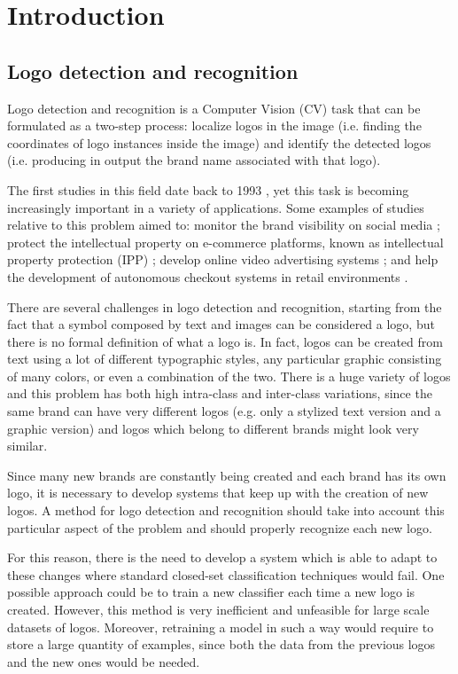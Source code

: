 \chapter{Introduction}
\label{chap:introduction}

\section{Logo detection and recognition}
\label{sec:logodet-intro}

Logo detection and recognition is a Computer Vision (CV) task that can be formulated as a two-step process: localize logos in the image (i.e. finding the coordinates of logo instances inside the image) and identify the detected logos (i.e. producing in output the brand name associated with that logo).

The first studies in this field date back to 1993 \cite{doermann1993logo}, yet this task is becoming increasingly important in a variety of applications. Some examples of studies relative to this problem aimed to: monitor the brand visibility on social media \cite{7492197}; protect the intellectual property on e-commerce platforms, known as intellectual property protection (IPP) \cite{jin2020open}; develop online video advertising systems \cite{cheng2017video}; and help the development of autonomous checkout systems in retail environments \cite{mata2022standardsim}.

There are several challenges in logo detection and recognition, starting from the fact that a symbol composed by text and images can be considered a logo, but there is no formal definition of what a logo is. In fact, logos can be created from text using a lot of different typographic styles, any particular graphic consisting of many colors, or even a combination of the two.
There is a huge variety of logos and this problem has both high intra-class and inter-class variations, since the same brand can have very different logos (e.g. only a stylized text version and a graphic version) and logos which belong to different brands might look very similar.

Since many new brands are constantly being created and each brand has its own logo, it is necessary to develop systems that keep up with the creation of new logos. A method for logo detection and recognition should take into account this particular aspect of the problem and should properly recognize each new logo.

For this reason, there is the need to develop a system which is able to adapt to these changes where standard closed-set classification techniques would fail. One possible approach could be to train a new classifier each time a new logo is created. However, this method is very inefficient and unfeasible for large scale datasets of logos. Moreover, retraining a model in such a way would require to store a large quantity of examples, since both the data from the previous logos and the new ones would be needed.

